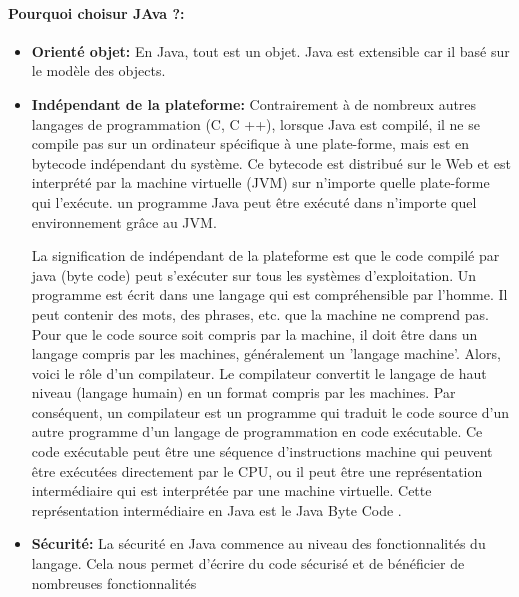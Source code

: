         \paragraph{Pourquoi choisur JAva ?: }
        \begin{itemize}
                \item \textbf{Orienté objet: } En Java, tout est un objet. Java est extensible 
                car il basé sur le modèle des objects.
                \item \textbf{ Indépendant de la plateforme: } Contrairement à de nombreux 
                autres langages de programmation (C, C ++), lorsque Java est compilé, il ne se 
                compile pas sur un ordinateur spécifique à une plate-forme, mais est en 
                bytecode indépendant du système. Ce bytecode est distribué sur le Web 
                et est interprété par la machine virtuelle (JVM) sur n'importe quelle 
                plate-forme qui l'exécute. un programme Java peut être exécuté dans n'importe quel 
                environnement grâce au JVM.
                \par 
                La signification de indépendant de la plateforme est que le code compilé par java (byte code) 
                peut s'exécuter sur tous les systèmes d'exploitation.
                Un programme est écrit dans une langage qui est compréhensible par l'homme. 
                Il peut contenir des mots, des phrases, etc. que la machine ne comprend pas. 
                Pour que le code source soit compris par la machine, il doit être dans un langage 
                compris par les machines, généralement un 'langage machine'. Alors, voici le rôle 
                d'un compilateur. Le compilateur convertit le langage de haut niveau (langage humain) 
                en un format compris par les machines. Par conséquent, un compilateur est un programme 
                qui traduit le code source d'un autre programme d'un langage de programmation en code exécutable.
                Ce code exécutable peut être une séquence d'instructions machine qui peuvent être exécutées 
                directement par le CPU, ou il peut être une représentation intermédiaire qui est interprétée 
                par une machine virtuelle. Cette représentation intermédiaire en Java est le Java Byte Code \cite{java}.
                \item \textbf{Sécurité: } La sécurité en Java commence au niveau des fonctionnalités 
                du langage. Cela nous permet d'écrire du code sécurisé et de bénéficier de nombreuses fonctionnalités 

\end{itemize}
